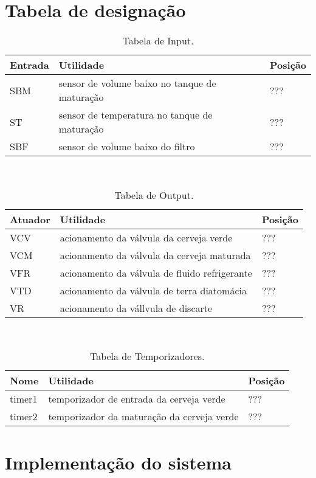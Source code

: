 \documentclass[12pt]{article}
\begin{document}
\section {Tabela de designação}
{
\begin {table}
\caption {Tabela de Input.}
\centering
	\begin{tabular}{|  p{2cm} | p{10cm} | p{2cm} | }
\hline
Entrada & Utilidade & Posição\\
\hline
SBM & sensor de volume baixo no tanque de maturação & ??? \\
  ST & sensor de temperatura no tanque de maturação & ??? \\
 SBF & sensor de volume baixo do filtro & ??? \\
\hline
\end{tabular}\\
\end {table}
}


{
\begin {table}
\caption {Tabela de Output.}
\centering
\begin{tabular}{|  p{2cm} | p{10cm} | p{2cm} | }
\hline
Atuador & Utilidade & Posição\\
\hline
  VCV & acionamento da válvula da cerveja verde & ??? \\
  VCM & acionamento da válvula da cerveja maturada & ??? \\
 VFR & acionamento da válvula de fluido refrigerante & ??? \\
VTD & acionamento da válvula de terra diatomácia & ???\\
VR & acionamento da vállvula de discarte & ???\\
 \hline
\end{tabular}\\
\end{table}
}


{
\begin {table}
\caption {Tabela de Temporizadores.}
\centering
\begin{tabular}{|  p{2cm} | p{10cm} | p{2cm} | }
\hline
Nome & Utilidade & Posição\\
\hline
timer1 &  temporizador de entrada da cerveja verde & ??? \\
 timer2 & temporizador da maturação da cerveja verde & ??? \\
 \hline
\end{tabular}
\end{table}
}

\section {Implementação do sistema}
\end{document}
